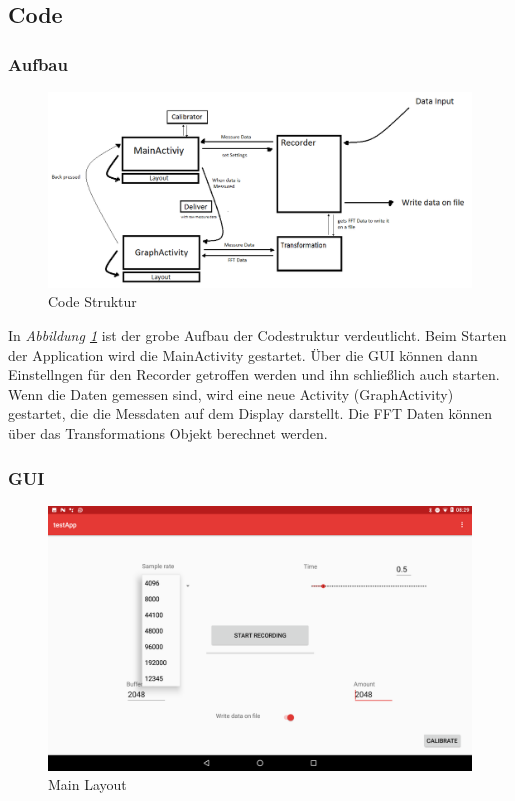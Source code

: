 \documentclass{article}
\begin{document}
{	\subsection{Code}

		\subsubsection{Aufbau}
			\begin{figure}
				\includegraphics[scale=0.3]{Bilder/blockschaltbild.png}
				\centering
				\vspace{0 cm}
				\caption{Code Struktur}
				\label{fig8}	
			\end{figure}
			
			In \textit{Abbildung \ref{fig8}} ist der grobe Aufbau der Codestruktur verdeutlicht. Beim Starten der Application wird die MainActivity gestartet. Über die GUI können dann Einstellngen für den Recorder getroffen werden und ihn schließlich auch starten. Wenn die Daten gemessen sind, wird eine neue Activity (GraphActivity) gestartet, die die Messdaten auf dem Display darstellt. Die FFT Daten können über das Transformations Objekt berechnet werden.



\newpage
		\subsubsection{GUI}

		\begin{figure}
			\includegraphics[scale=0.15]{Bilder/Screenshot_20180327-082929.png}
			\centering
			\vspace{0 cm}
			\caption{Main Layout}
			\label{fig9}	
		\end{figure}
	

}
\end{document}
